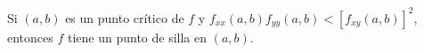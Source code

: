\item Si $(a, b)$ es un punto crítico de $f$ y $f_{xx}(a, b)f_{yy}(a, b) < [f_{xy}(a, b)]^2$, entonces $f$ tiene un punto de silla en $(a, b)$.
